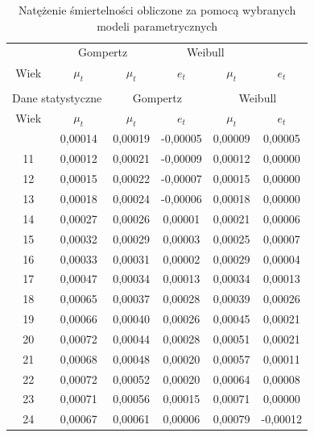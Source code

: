\documentclass[12pt]{mwbk}
\theoremstyle{plain}
\theoremstyle{definition}
\theoremstyle{remark}
\begin{document}
	\begin{center}
\begin{longtable}{|c|c|c|c|c|c|} 
	\caption{Natężenie śmiertelności obliczone za pomocą
	wybranych modeli parametrycznych}
	\\\hhline{|======|}
\multicolumn{2}{|c|}{Dane statystyczne} & \multicolumn{2}{c|}{Gompertz} & \multicolumn{2}{c|}{Weibull}
	\\\hhline{|======|}
Wiek & $  \mu_t$& $\mu_t$& $e_t$ &$\mu_t$& $e_t$ 
	\\\hhline{|======|}
\endfirsthead
\multicolumn{6}{c}{\footnotesize kontynuacja\ldots}\\
\hline
\multicolumn{2}{|c|}{Dane statystyczne} & \multicolumn{2}{c|}{Gompertz} & \multicolumn{2}{c|}{Weibull}
	\\\hhline{|======|}
Wiek & $  \mu_t$& $\mu_t$& $e_t$ &$\mu_t$& $e_t$
	\\\hhline{|======|}
\endhead
\multicolumn{6}{c}{\footnotesize kontynuacja na następnej stronie\ldots}
\endfoot
\endlastfoot
10 & 0,00014 & 0,00019 & -0,00005 &0,00009  & 0,00005   \\ \hline
11 & 0,00012 & 0,00021 & -0,00009 &0,00012  & 0,00000  \\ \hline
12 & 0,00015 & 0,00022 & -0,00007 & 0,00015 & 0,00000  \\ \hline
13 & 0,00018 & 0,00024 & -0,00006 & 0,00018 & 0,00000  \\ \hline
14 & 0,00027 & 0,00026 & 0,00001  & 0,00021 & 0,00006  \\ \hline
15 & 0,00032 & 0,00029 & 0,00003  & 0,00025 & 0,00007  \\ \hline
16 & 0,00033 & 0,00031 & 0,00002  & 0,00029 & 0,00004  \\ \hline
17 & 0,00047 & 0,00034 & 0,00013  & 0,00034 & 0,00013  \\ \hline
18 & 0,00065 & 0,00037 & 0,00028  & 0,00039 & 0,00026  \\ \hline
19 & 0,00066 & 0,00040 & 0,00026  & 0,00045 & 0,00021  \\ \hline
20 & 0,00072 & 0,00044 & 0,00028  & 0,00051 & 0,00021  \\ \hline
21 & 0,00068 & 0,00048 & 0,00020  & 0,00057 & 0,00011 \\ \hline
22 & 0,00072 & 0,00052 & 0,00020  & 0,00064 & 0,00008  \\ \hline
23 & 0,00071 & 0,00056 & 0,00015  & 0,00071 & 0,00000  \\ \hline
24 & 0,00067 & 0,00061 & 0,00006  & 0,00079 & -0,00012 \\ \hline

\end{longtable}
\end{center}
\end{document}
